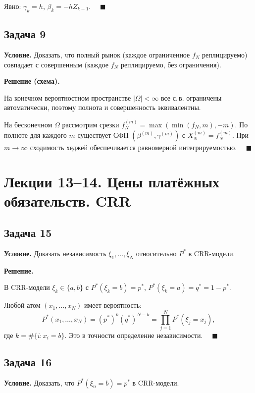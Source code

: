 \documentclass[12pt,a4paper]{article}
\theoremstyle{zadacha}
\begin{document}
Явно: $\gamma_k = h$, $\beta_k = -h Z_{k-1}$. $\quad\blacksquare$

\subsection*{Задача 9}

\textbf{Условие.} Доказать, что полный рынок (каждое ограниченное $f_N$ реплицируемо) совпадает с совершенным (каждое $f_N$ реплицируемо, без ограничения).

\medskip
\textbf{Решение (схема).}

На конечном вероятностном пространстве $|\Omega| < \infty$ все с.\,в. ограничены автоматически, поэтому полнота и совершенность эквивалентны.

На бесконечном $\Omega$ рассмотрим срезки $f_N^{(m)} = \max(\min(f_N, m), -m)$. По полноте для каждого $m$ существует СФП $(\beta^{(m)}, \gamma^{(m)})$ с $X_N^{(m)} = f_N^{(m)}$. При $m \to \infty$ сходимость хеджей обеспечивается равномерной интегрируемостью. $\quad\blacksquare$

\section{Лекции 13–14. Цены платёжных обязательств. CRR}

\subsection*{Задача 15}

\textbf{Условие.} Доказать независимость $\xi_1, \ldots, \xi_N$ относительно $P^*$ в CRR-модели.

\medskip
\textbf{Решение.}

В CRR-модели $\xi_k \in \{a, b\}$ с $P^*(\xi_k = b) = p^*$, $P^*(\xi_k = a) = q^* = 1 - p^*$.

Любой атом $(x_1, \ldots, x_N)$ имеет вероятность:
\[
P^*(x_1, \ldots, x_N) = (p^*)^k (q^*)^{N-k} = \prod_{j=1}^N P^*(\xi_j = x_j),
\]
где $k = \#\{i : x_i = b\}$. Это в точности определение независимости. $\quad\blacksquare$

\subsection*{Задача 16}

\textbf{Условие.} Доказать, что $P^*(\xi_n = b) = p^*$ в CRR-модели.
\end{document}
